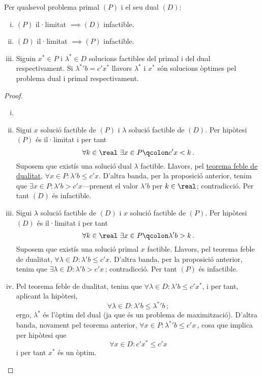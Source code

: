 \begin{col}\label{col:feb}
	Per qualsevol problema primal $(P)$ i el seu dual $(D)$: 
    \begin{enumerate}[i)]
        \item $\left(P\right)$ il·limitat $\implies \left(D\right)$ infactible.
        \item $\left(D\right)$ il·limitat $\implies \left(P\right)$ infactible.
        \item Siguin $x^\ast \in P$ i $\lambda^\ast \in D$ solucions factibles del primal i del dual respectivament. Si ${\lambda^\ast}'b = c'x^\ast$ llavors $\lambda^\ast$ i $x^\ast$ són solucions òptimes pel problema dual i primal respectivament.
    \end{enumerate}
	\begin{proof}
		\begin{enumerate}[i)]
			\item[]
			\item Sigui $x$ solució factible de $(P)$ i $\lambda$ solució factible de $(D)$. Per hipòtesi $(P)$ és il·limitat i per tant \[\forall k \in \real\ \exists x\in P\qcolon c'x < k\,. \] Suposem que existís una solució dual $\lambda$ factible. Llavors, pel \hyperref[teo:dualitat-feble]{teorema feble de dualitat}, $\forall x\in P\colon \lambda'b \le c'x$. D'altra banda, per la proposició anterior, tenim que $\exists x\in P\colon \lambda'b > c'x$---prenent el valor $\lambda'b$ per $k\in\real$; contradicció. Per tant $(D)$ és infactible.
			\item Sigui $\lambda$ solució factible de $(D)$ i $x$ solució factible de $(P)$. Per hipòtesi $(D)$ és il·limitat i per tant \[\forall k \in \real\ \exists x\in P\qcolon \lambda'b > k\,. \] Suposem que existís una solució primal $x$ factible. Llavors, pel {teorema feble de dualitat}, $\forall \lambda\in D\colon \lambda'b \le c'x$. D'altra banda, per la proposició anterior, tenim que $\exists \lambda\in D\colon \lambda'b > c'x\,$; contradicció. Per tant $(P)$ és infactible.
			\item Pel teorema feble de dualitat, tenim que $\forall \lambda \in D: \lambda'b \le c'{x^\ast}$, i per tant, aplicant la hipòtesi, \[\forall \lambda \in D: \lambda 'b \le {\lambda^\ast}'b\,;\] ergo, $\lambda^\ast$ és l'òptim del dual (ja que és un problema de maximització). D'altra banda, novament pel teorema anterior, $\forall x \in P: {\lambda^\ast}'b \le c'x\,$, cosa que implica per hipòtesi que \[\forall x \in D: c'{x^\ast} \le c'x\] i per tant $x^\ast$ és un òptim.
		\end{enumerate}
	\end{proof}
\end{col}

